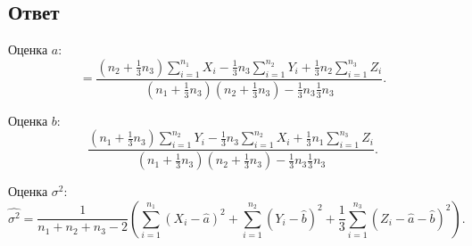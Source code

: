 \subsection*{Ответ}
Оценка $a$:
\begin{equation}
    = \frac{
        \left ( n_2 + \frac{1}{3} n_3 \right ) \sum_{i=1}^{n_1} X_i - \frac{1}{3} n_3 \sum_{i=1}^{n_2} Y_i + \frac{1}{3} n_2 \sum_{i=1}^{n_3} Z_i
    }
    {
        \left ( n_1 + \frac{1}{3} n_3 \right ) \left ( n_2 + \frac{1}{3} n_3 \right ) - \frac{1}{3} n_3 \frac{1}{3} n_3
    } .
\end{equation}

Оценка $b$:
\begin{equation}
    \frac{
        \left ( n_1 + \frac{1}{3} n_3 \right ) \sum_{i=1}^{n_2} Y_i - \frac{1}{3} n_3 \sum_{i=1}^{n_2} X_i + \frac{1}{3} n_1 \sum_{i=1}^{n_3} Z_i
    }
    {
        \left ( n_1 + \frac{1}{3} n_3 \right ) \left ( n_2 + \frac{1}{3} n_3 \right ) - \frac{1}{3} n_3 \frac{1}{3} n_3
    } .
\end{equation}

Оценка $\sigma^2$:
\begin{equation}
    \widehat{\sigma^2}
    = \frac{1}{n_1 + n_2 + n_3 - 2}
    \left (
    \sum_{i=1}^{n_1} \left ( X_i - \widehat{a} \right )^2
    + \sum_{i=1}^{n_2} \left ( Y_i - \widehat{b} \right )^2
    + \frac{1}{3} \sum_{i=1}^{n_3} \left ( Z_i - \widehat{a} - \widehat{b} \right )^2
    \right ) .
\end{equation}
